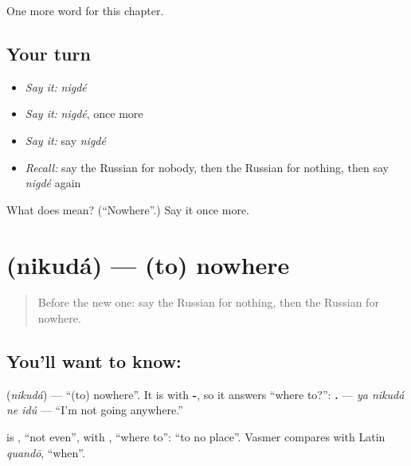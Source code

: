 \begin{grammarlens}[title={What you've built}]
One more word for this chapter.
\end{grammarlens}

\subsection*{Your turn}
\begin{itemize}
\raggedright
  \item \emph{Say it:} \emph{nigdé}
  \item \emph{Say it:} \emph{nigdé}, once more
  \item \emph{Say it:} say \emph{nigdé}
  \item \emph{Recall:} say the Russian for nobody, then the Russian for nothing, then say \emph{nigdé} again
\end{itemize}

\begin{tcolorbox}[breakable,colback=teal!4,colframe=teal!35!black,title={Before you move on}]
What does  mean? (\textquotedblleft{}Nowhere\textquotedblright{}.) Say it once more.
\end{tcolorbox}
\section[\texorpdfstring{\ru{никуда} (nikudá)}{никуда (nikudá)}]{ (nikudá) — (to) nowhere}

\label{lesson:RU-C136-nikuda}



\begin{quote}
Before the new one: say the Russian for nothing, then the Russian for nowhere.
\end{quote}

\subsection*{You'll want to know: }
\textbf{} (\emph{nikudá}) — \textquotedblleft{}(to) nowhere\textquotedblright{}. It is \textbf{} with \textbf{-}, so it answers \textquotedblleft{}where to?\textquotedblright{}: \textbf{   .} — \emph{ya nikudá ne idú} — \textquotedblleft{}I'm not going anywhere.\textquotedblright{}

\begin{cousinweb}
\textbf{} is \emph{}, \textquotedblleft{}not even\textquotedblright{}, with \emph{}, \textquotedblleft{}where to\textquotedblright{}: \textquotedblleft{}to no place\textquotedblright{}. Vasmer compares \emph{} with Latin \emph{quandō}, \textquotedblleft{}when\textquotedblright{}.
\end{cousinweb}

